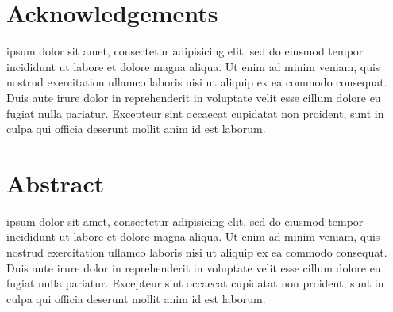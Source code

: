 \documentclass[11pt,twoside,a4paper]{article}
\numberwithin{equation}{section}
\begin{document}


\newpage
\thispagestyle{empty}

\section*{Acknowledgements}
ipsum dolor sit amet, consectetur adipisicing elit, sed do eiusmod tempor incididunt ut labore et dolore magna aliqua. Ut enim ad minim veniam, quis nostrud exercitation ullamco laboris nisi ut aliquip ex ea commodo consequat. Duis aute irure dolor in reprehenderit in voluptate velit esse cillum dolore eu fugiat nulla pariatur. Excepteur sint occaecat cupidatat non proident, sunt in culpa qui officia deserunt mollit anim id est laborum.

\newpage
\thispagestyle{empty}

\section*{Abstract}
ipsum dolor sit amet, consectetur adipisicing elit, sed do eiusmod tempor incididunt ut labore et dolore magna aliqua. Ut enim ad minim veniam, quis nostrud exercitation ullamco laboris nisi ut aliquip ex ea commodo consequat. Duis aute irure dolor in reprehenderit in voluptate velit esse cillum dolore eu fugiat nulla pariatur. Excepteur sint occaecat cupidatat non proident, sunt in culpa qui officia deserunt mollit anim id est laborum.

\newpage
{
  \hypersetup{hidelinks}
  \tableofcontents
}

\newpage
\thispagestyle{empty}
\listoffigures
\listoftables

\newpage








\printbibliography[heading=bibintoc]
\end{document}
